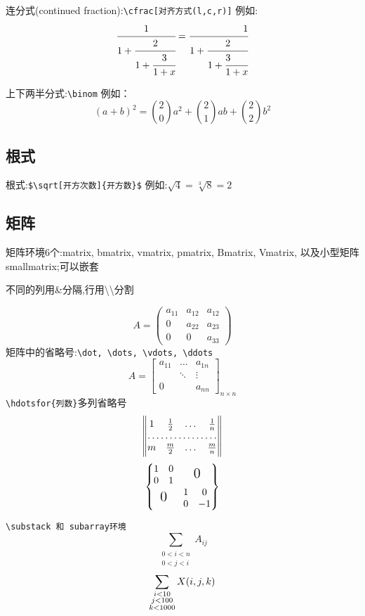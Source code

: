 \documentclass[titlepage, hyperref, UTF8]{ctexart}
\begin{document}
连分式(continued fraction):\verb|\cfrac[对齐方式(l,c,r)]|
例如:
\[
\cfrac{1}{1+\cfrac2{1+\cfrac3{1+x}}}=
\cfrac[r]{1}{1+\cfrac2{1+\cfrac[l]{3}{1+x}}}
\]

上下两半分式:\verb|\binom|
例如：
\[
(a+b)^2=\binom 20 a^2+\binom21 ab
+\binom22b^2
\]

\subsection{根式}
根式:\verb|$\sqrt[开方次数]{开方数}$|
例如:$\sqrt 4=\sqrt[3]{8}=2$
\subsection{矩阵}
矩阵环境6个:matrix, bmatrix, vmatrix,
pmatrix, Bmatrix, Vmatrix, 以及小型矩阵smallmatrix;可以嵌套

不同的列用\&分隔,行用\textbackslash\textbackslash 分割

\[
A = \begin{pmatrix}
a_{11}&a_{12}&a_{12}\\
0&a_{22}&a_{23}\\
0&0&a_{33}
\end{pmatrix}
\]
矩阵中的省略号:\verb|\dot, \dots, \vdots, \ddots|
\[
A = \begin{bmatrix}
a_{11}&\dots&a_{1n}\\
&\ddots&\vdots\\
0& &a_{nn}
\end{bmatrix}_{n\times n}
\]
\verb|\hdotsfor{列数}|多列省略号
\[
\begin{Vmatrix}
1& \frac12& \dots& \frac1n\\
\hdotsfor{4}\\
m& \frac m2& \dots& \frac mn
\end{Vmatrix}
\]
\[
\begin{Bmatrix}
\begin{matrix} 1& 0\\ 0& 1 \end{matrix}
& \text{\Large 0}\\
\text{\Large 0}& 
\begin{matrix} 1& 0\\ 0& -1 \end{matrix}
\end{Bmatrix}
\]

\verb|\substack 和 subarray环境|
\[
\sum_{\substack{0<i<n\\ 0<j<i}} A_{ij}
\]
\[
\sum_{
\begin{subarray}{c}
i<10\\ j<100\\ k<1000
\end{subarray}}
X(i,j,k)
\]
\end{document}
